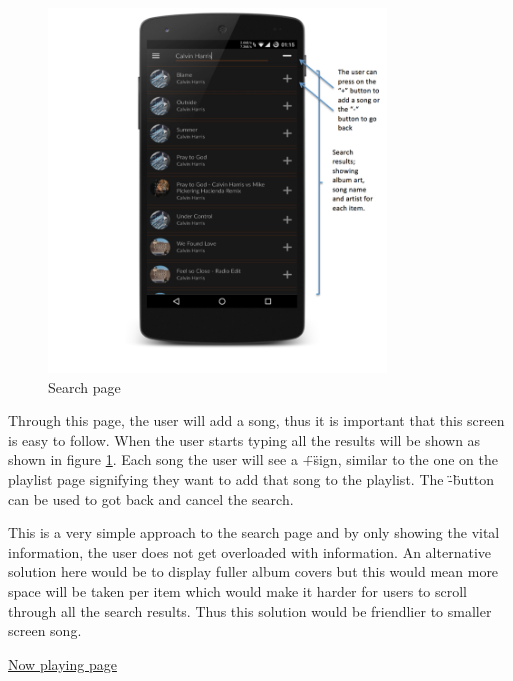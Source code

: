 \noindent
\begin{figure}[h!]
\centering
\includegraphics[width=0.8\textwidth]{./img/searchannotated.png}
\caption{Search page}
\label{fig:searchpage}
\end{figure}

Through this page, the user will add a song, thus it is important that this screen is easy to follow. When the user starts typing all the results will be shown as shown in figure \ref{fig:searchpage}. Each song the user will see a \"+\" sign, similar to the one on the playlist page signifying they want to add that song to the playlist. The \"-\" button can be used to got back and cancel the search. 

This is a very simple approach to the search page and by only showing the vital information, the user does not get overloaded with information. An alternative solution here would be to display fuller album covers but this would mean more space will be taken per item which would make it harder for users to scroll through all the search results. Thus this solution would be friendlier to smaller screen song.

\newpage

\noindent\underline{Now playing page}\newline

